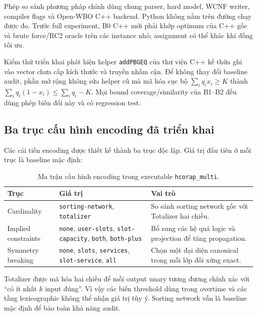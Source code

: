 \documentclass[12pt,a4paper]{article}
\begin{document}
Phép so sánh phương pháp chính dùng chung parser, hard model, WCNF writer,
compiler flags và Open-WBO C++ backend. Python không nằm trên đường chạy được
đo. Trước full experiment, B0 C++ mới phải khớp optimum của C++ gốc và brute
force/RC2 oracle trên các instance nhỏ; assignment có thể khác khi đồng tối ưu.

Kiểm thử triển khai phát hiện helper \texttt{addPBGEQ} của thư viện C++ kế thừa
ghi vào vector chưa cấp kích thước và truyền nhầm cận. Để không thay đổi baseline
audit, phần mở rộng không sửa helper cũ mà mã hóa cục bộ
$\sum_i q_i x_i\geq K$ thành
$\sum_i q_i(1-x_i)\leq\sum_i q_i-K$. Mọi bound coverage/similarity của B1--B2
đều dùng phép biến đổi này và có regression test.

\subsection{Ba trục cấu hình encoding đã triển khai}

Các cải tiến encoding được thiết kế thành ba trục độc lập. Giá trị đầu tiên ở
mỗi trục là baseline mặc định:

\begin{table}[H]
\centering
\caption{Ma trận cấu hình encoding trong executable \texttt{hcorap\_multi}.}
\begin{tabularx}{\textwidth}{@{}p{3.4cm}>{\raggedright\arraybackslash}p{4.4cm}Y@{}}
\toprule
Trục & Giá trị & Vai trò \\
\midrule
Cardinality
  & \texttt{sorting-network}, \texttt{totalizer}
  & So sánh sorting network gốc với Totalizer hai chiều. \\
Implied constraints
  & \texttt{none}, \texttt{user-slots}, \texttt{slot-capacity},
    \texttt{both}, \texttt{both-plus}
  & Bổ sung các hệ quả logic và projection để tăng propagation. \\
Symmetry breaking
  & \texttt{none}, \texttt{slots}, \texttt{services},
    \texttt{slot-service}, \texttt{all}
  & Chọn một đại diện canonical trong mỗi lớp đối xứng exact. \\
\bottomrule
\end{tabularx}
\end{table}

Totalizer được mã hóa hai chiều để mỗi output unary tương đương chính xác với
``có ít nhất $k$ input đúng''. Vì vậy các biến threshold dùng trong overtime và
các tầng lexicographic không thể nhận giá trị tùy ý. Sorting network vẫn là
baseline mặc định để bảo toàn khả năng audit.
\end{document}
